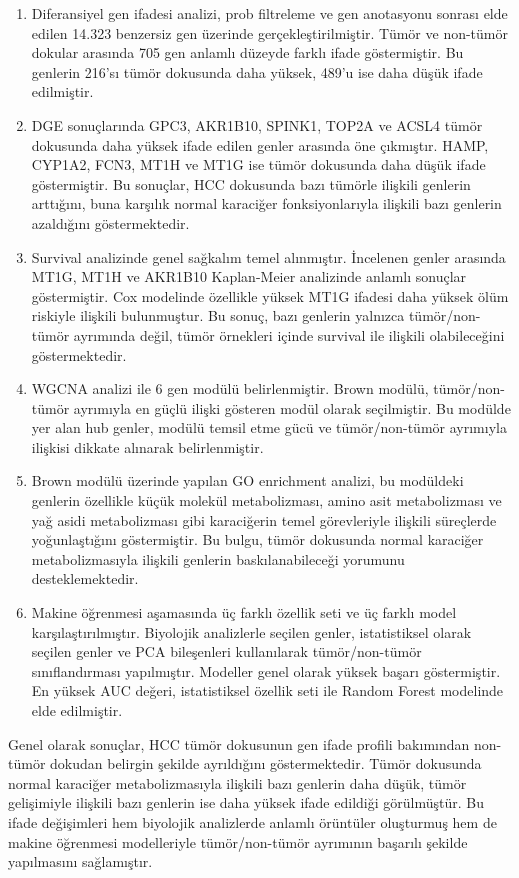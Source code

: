 \documentclass[12pt,a4paper,oneside]{report}
\begin{document}
\begin{enumerate}[leftmargin=*]
    \item Diferansiyel gen ifadesi analizi, prob filtreleme ve gen anotasyonu sonrası elde edilen 14.323 benzersiz gen üzerinde gerçekleştirilmiştir. Tümör ve non-tümör dokular arasında 705 gen anlamlı düzeyde farklı ifade göstermiştir. Bu genlerin 216'sı tümör dokusunda daha yüksek, 489'u ise daha düşük ifade edilmiştir.
    
    \item DGE sonuçlarında GPC3, AKR1B10, SPINK1, TOP2A ve ACSL4 tümör dokusunda daha yüksek ifade edilen genler arasında öne çıkmıştır. HAMP, CYP1A2, FCN3, MT1H ve MT1G ise tümör dokusunda daha düşük ifade göstermiştir. Bu sonuçlar, HCC dokusunda bazı tümörle ilişkili genlerin arttığını, buna karşılık normal karaciğer fonksiyonlarıyla ilişkili bazı genlerin azaldığını göstermektedir.
    
    \item Survival analizinde genel sağkalım temel alınmıştır. İncelenen genler arasında MT1G, MT1H ve AKR1B10 Kaplan-Meier analizinde anlamlı sonuçlar göstermiştir. Cox modelinde özellikle yüksek MT1G ifadesi daha yüksek ölüm riskiyle ilişkili bulunmuştur. Bu sonuç, bazı genlerin yalnızca tümör/non-tümör ayrımında değil, tümör örnekleri içinde survival ile ilişkili olabileceğini göstermektedir.
    
    \item WGCNA analizi ile 6 gen modülü belirlenmiştir. Brown modülü, tümör/non-tümör ayrımıyla en güçlü ilişki gösteren modül olarak seçilmiştir. Bu modülde yer alan hub genler, modülü temsil etme gücü ve tümör/non-tümör ayrımıyla ilişkisi dikkate alınarak belirlenmiştir.
    
    \item Brown modülü üzerinde yapılan GO enrichment analizi, bu modüldeki genlerin özellikle küçük molekül metabolizması, amino asit metabolizması ve yağ asidi metabolizması gibi karaciğerin temel görevleriyle ilişkili süreçlerde yoğunlaştığını göstermiştir. Bu bulgu, tümör dokusunda normal karaciğer metabolizmasıyla ilişkili genlerin baskılanabileceği yorumunu desteklemektedir.
    
    \item Makine öğrenmesi aşamasında üç farklı özellik seti ve üç farklı model karşılaştırılmıştır. Biyolojik analizlerle seçilen genler, istatistiksel olarak seçilen genler ve PCA bileşenleri kullanılarak tümör/non-tümör sınıflandırması yapılmıştır. Modeller genel olarak yüksek başarı göstermiştir. En yüksek AUC değeri, istatistiksel özellik seti ile Random Forest modelinde elde edilmiştir.
\end{enumerate}

Genel olarak sonuçlar, HCC tümör dokusunun gen ifade profili bakımından non-tümör dokudan belirgin şekilde ayrıldığını göstermektedir. Tümör dokusunda normal karaciğer metabolizmasıyla ilişkili bazı genlerin daha düşük, tümör gelişimiyle ilişkili bazı genlerin ise daha yüksek ifade edildiği görülmüştür. Bu ifade değişimleri hem biyolojik analizlerde anlamlı örüntüler oluşturmuş hem de makine öğrenmesi modelleriyle tümör/non-tümör ayrımının başarılı şekilde yapılmasını sağlamıştır.
\end{document}
